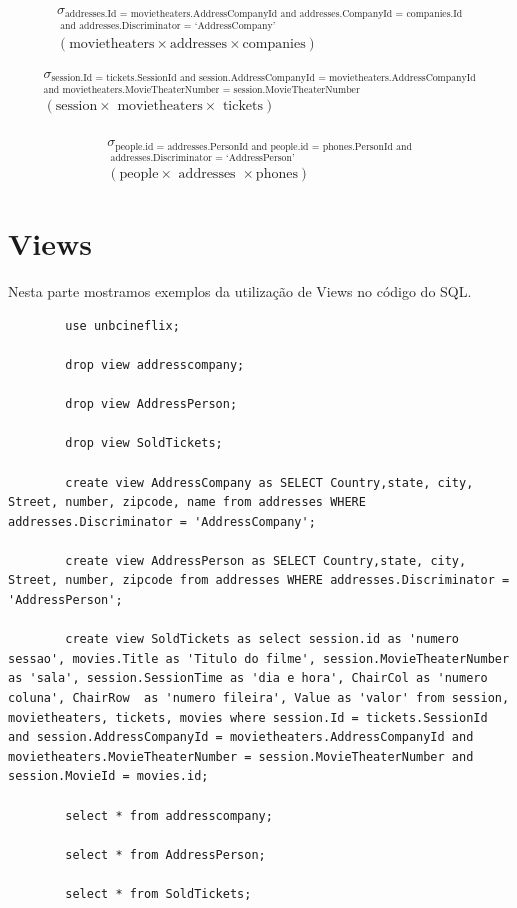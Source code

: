 \documentclass[a4paper,10pt]{article}
\begin{document}
\begin{eqnarray*}
\sigma_{\textrm{addresses.Id = movietheaters.AddressCompanyId and addresses.CompanyId = companies.Id}}\\
_{\textrm{ and addresses.Discriminator = `AddressCompany'}}\\
(\textrm{movietheaters} \times \textrm{addresses} \times \textrm{companies})
\end{eqnarray*}

\begin{eqnarray*}
\sigma_{\textrm{session.Id = tickets.SessionId and session.AddressCompanyId = movietheaters.AddressCompanyId}}\\
_{ \textrm{and movietheaters.MovieTheaterNumber = session.MovieTheaterNumber}}\\
(\textrm{session} \times \textrm{ movietheaters} \times \textrm{ tickets})\\
\end{eqnarray*}

\begin{eqnarray*}
\sigma_{ \textrm{people.id = addresses.PersonId and people.id = phones.PersonId and}}\\
_{\textrm{ addresses.Discriminator = `AddressPerson'}}\\
(\textrm{people} \times \textrm{ addresses } \times \textrm {phones})
\end{eqnarray*}

\section{Views}

Nesta parte mostramos exemplos da utilização de Views no código do SQL.

\begin{lstlisting}
		use unbcineflix;

		drop view addresscompany;

		drop view AddressPerson;

		drop view SoldTickets;

		create view AddressCompany as SELECT Country,state, city, Street, number, zipcode, name from addresses WHERE addresses.Discriminator = 'AddressCompany';

		create view AddressPerson as SELECT Country,state, city, Street, number, zipcode from addresses WHERE addresses.Discriminator = 'AddressPerson';

		create view SoldTickets as select session.id as 'numero sessao', movies.Title as 'Titulo do filme', session.MovieTheaterNumber as 'sala', session.SessionTime as 'dia e hora', ChairCol as 'numero coluna', ChairRow  as 'numero fileira', Value as 'valor' from session, movietheaters, tickets, movies where session.Id = tickets.SessionId and session.AddressCompanyId = movietheaters.AddressCompanyId and movietheaters.MovieTheaterNumber = session.MovieTheaterNumber and session.MovieId = movies.id;

		select * from addresscompany;

		select * from AddressPerson;

		select * from SoldTickets;
\end{lstlisting}
\end{document}
